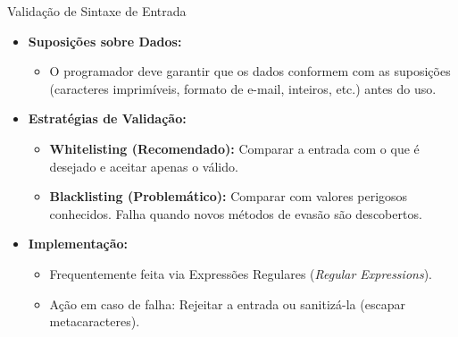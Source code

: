 \begin{frame}{Validação de Sintaxe de Entrada}
    \begin{itemize}
        \item \textbf{Suposições sobre Dados:}
              \begin{itemize}
                  \item O programador deve garantir que os dados conformem com as suposições (caracteres imprimíveis, formato de e-mail, inteiros, etc.) antes do uso.
              \end{itemize}

        \item \textbf{Estratégias de Validação:}
              \begin{itemize}
                  \item \textbf{Whitelisting (Recomendado):} Comparar a entrada com o que é desejado e aceitar apenas o válido.
                  \item \textbf{Blacklisting (Problemático):} Comparar com valores perigosos conhecidos. Falha quando novos métodos de evasão são descobertos.
              \end{itemize}

        \item \textbf{Implementação:}
              \begin{itemize}
                  \item Frequentemente feita via Expressões Regulares (\textit{Regular Expressions}).
                  \item Ação em caso de falha: Rejeitar a entrada ou sanitizá-la (escapar metacaracteres).
              \end{itemize}
    \end{itemize}
\end{frame}

